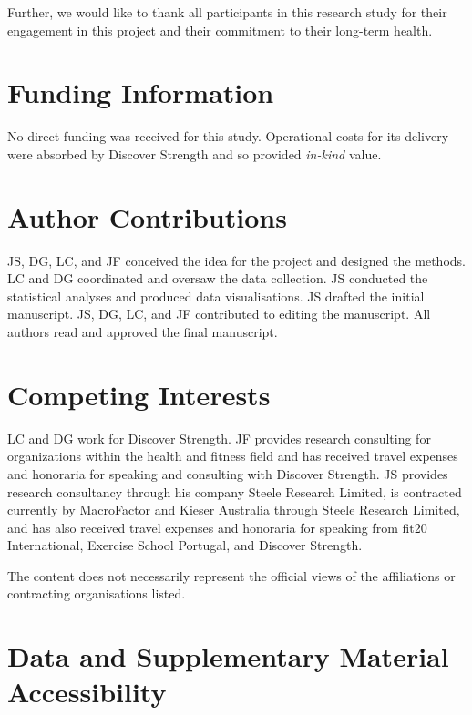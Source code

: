 \documentclass[
]{article}
\begin{document}
Further, we would like to thank all participants in this research study
for their engagement in this project and their commitment to their
long-term health.

\section{Funding Information}\label{funding-information}

No direct funding was received for this study. Operational costs for its
delivery were absorbed by Discover Strength and so provided
\emph{in-kind} value.

\section{Author Contributions}\label{author-contributions}

JS, DG, LC, and JF conceived the idea for the project and designed the
methods. LC and DG coordinated and oversaw the data collection. JS
conducted the statistical analyses and produced data visualisations. JS
drafted the initial manuscript. JS, DG, LC, and JF contributed to
editing the manuscript. All authors read and approved the final
manuscript.

\section{Competing Interests}\label{competing-interests}

LC and DG work for Discover Strength. JF provides research consulting
for organizations within the health and fitness field and has received
travel expenses and honoraria for speaking and consulting with Discover
Strength. JS provides research consultancy through his company Steele
Research Limited, is contracted currently by MacroFactor and Kieser
Australia through Steele Research Limited, and has also received travel
expenses and honoraria for speaking from fit20 International, Exercise
School Portugal, and Discover Strength.

The content does not necessarily represent the official views of the
affiliations or contracting organisations listed.

\section{Data and Supplementary Material
Accessibility}\label{data-and-supplementary-material-accessibility}
\end{document}
